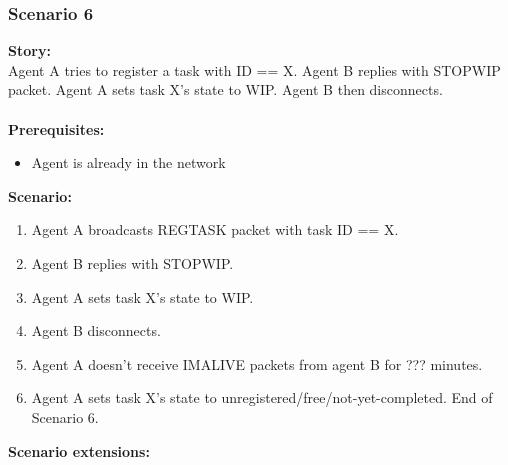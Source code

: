 \documentclass{article}
\begin{document}
\subsubsection{Scenario 6}
\noindent\textbf{Story:} \\
Agent A tries to register a task with ID == X. Agent B replies with STOPWIP packet. Agent A sets task X's state to WIP. Agent B then disconnects. \\\\
\textbf{Prerequisites:}
\begin{itemize}
    \item Agent is already in the network
\end{itemize}
\textbf{Scenario:}
\begin{enumerate}
    \item Agent A broadcasts REGTASK packet with task ID == X.
    \item Agent B replies with STOPWIP.
    \item Agent A sets task X's state to WIP.
    \item Agent B disconnects.
    \item Agent A doesn't receive IMALIVE packets from agent B for ??? minutes.
    \item Agent A sets task X's state to unregistered/free/not-yet-completed. End of Scenario 6.
\end{enumerate}
\textbf{Scenario extensions:}
\end{document}
